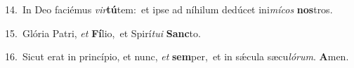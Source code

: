 {\numbfont\textcolor{\numbcolor}{14.}}~In Deo faciémus \textit{vir}\-\textbf{tú}tem:~\star et ipse ad níhilum dedúcet ini\-\textit{mí}\-\textit{cos} \textbf{nos}\-tros.\par
{\numbfont\textcolor{\numbcolor}{15.}}~Glória Patri, \textit{et} \textbf{Fí}\-lio,~\star et Spirí\-\textit{tu}\-\textit{i} \textbf{Sanc}\-to.\par
{\numbfont\textcolor{\numbcolor}{16.}}~Sicut erat in princípio, et nunc, \textit{et} \textbf{sem}\-per,~\star et in sǽcula sæcu\-\textit{ló}\-\textit{rum}. \textbf{A}\-men.\par
